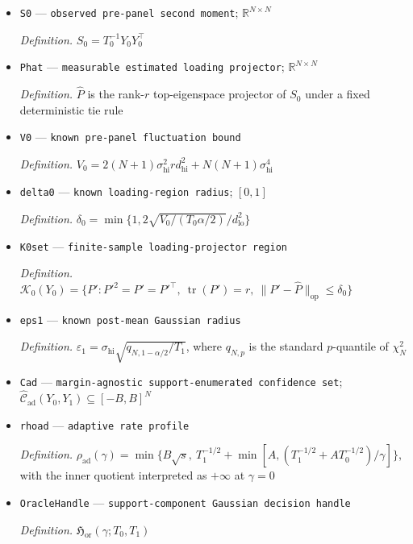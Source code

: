 \documentclass{article}
\begin{document}
\begin{itemize}
  \item \texttt{S0} --- \texttt{observed pre-\allowbreak{}panel second moment}; \(\mathbb R^{N\times N}\)
  \par\smallskip\noindent\emph{Definition.} \(S_0=T_0^{-1}Y_0Y_0^{\top}\)
  \item \texttt{Phat} --- \texttt{measurable estimated loading projector}; \(\mathbb R^{N\times N}\)
  \par\smallskip\noindent\emph{Definition.} \(\widehat P\) is the rank-\(r\) top-eigenspace projector of \(S_0\) under a fixed deterministic tie rule
  \item \texttt{V0} --- \texttt{known pre-\allowbreak{}panel fluctuation bound}
  \par\smallskip\noindent\emph{Definition.} \(V_0=2(N+1)\sigma_{\mathrm{hi}}^2r d_{\mathrm{hi}}^2+N(N+1)\sigma_{\mathrm{hi}}^4\)
  \item \texttt{delta0} --- \texttt{known loading-\allowbreak{}region radius}; \([0,1]\)
  \par\smallskip\noindent\emph{Definition.} \(\delta_0=\min\{1,2\sqrt{V_0/(T_0\alpha/2)}/d_{\mathrm{lo}}^2\}\)
  \item \texttt{K0set} --- \texttt{finite-\allowbreak{}sample loading-\allowbreak{}projector region}
  \par\smallskip\noindent\emph{Definition.} \(\mathcal K_0(Y_0)=\{P':P'^2=P'=P'^{\top},\ \operatorname{tr}(P')=r,\ \|P'-\widehat P\|_{\mathrm{op}}\le\delta_0\}\)
  \item \texttt{eps1} --- \texttt{known post-\allowbreak{}mean Gaussian radius}
  \par\smallskip\noindent\emph{Definition.} \(\varepsilon_1=\sigma_{\mathrm{hi}}\sqrt{q_{N,1-\alpha/2}/T_1}\), where \(q_{N,p}\) is the standard \(p\)-quantile of \(\chi_N^2\)
  \item \texttt{Cad} --- \texttt{margin-\allowbreak{}agnostic support-\allowbreak{}enumerated confidence set}; \(\widehat{\mathcal C}_{\mathrm{ad}}(Y_0,Y_1)\subseteq[-B,B]^N\)
  \item \texttt{rhoad} --- \texttt{adaptive rate profile}
  \par\smallskip\noindent\emph{Definition.} \(\rho_{\mathrm{ad}}(\gamma)=\min\{B\sqrt{s},\ T_1^{-1/2}+\min[A,(T_1^{-1/2}+AT_0^{-1/2})/\gamma]\}\), with the inner quotient interpreted as \(+\infty\) at \(\gamma=0\)
  \item \texttt{OracleHandle} --- \texttt{support-\allowbreak{}component Gaussian decision handle}
  \par\smallskip\noindent\emph{Definition.} \(\mathfrak H_{\mathrm{or}}(\gamma;T_0,T_1)\)

\end{itemize}
\end{document}
